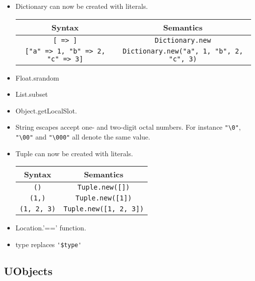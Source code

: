 \begin{itemize}
\item Dictionary can now be created with literals.

  \begin{center}
    \begin{tabular}{|c|c|}
      \hline
      Syntax & Semantics\\
      \hline
      \lstinline|[ => ]|
      &
      \lstinline|Dictionary.new|
      \\
      \lstinline|["a" => 1, "b" => 2, "c" => 3]|
      &
      \lstinline|Dictionary.new("a", 1, "b", 2, "c", 3)|
      \\
      \hline
    \end{tabular}
  \end{center}

\item Float.srandom
\item List.subset
\item Object.getLocalSlot.
\item String escapes accept one- and two-digit octal numbers.
  For instance \lstinline|"\0"|, \lstinline|"\00"| and
  \lstinline|"\000"| all denote the same value.

\item Tuple can now be created with literals.

  \begin{center}
    \begin{tabular}{|c|c|}
      \hline
      Syntax & Semantics\\
      \hline
      \lstinline|()|        & \lstinline|Tuple.new([])| \\
      \lstinline|(1,)|      & \lstinline|Tuple.new([1])| \\
      \lstinline|(1, 2, 3)| & \lstinline|Tuple.new([1, 2, 3])| \\
      \hline
    \end{tabular}
  \end{center}

\item Location.'==' function.

\item type replaces \lstinline|'$type'|
\end{itemize}

\subsection{UObjects}

